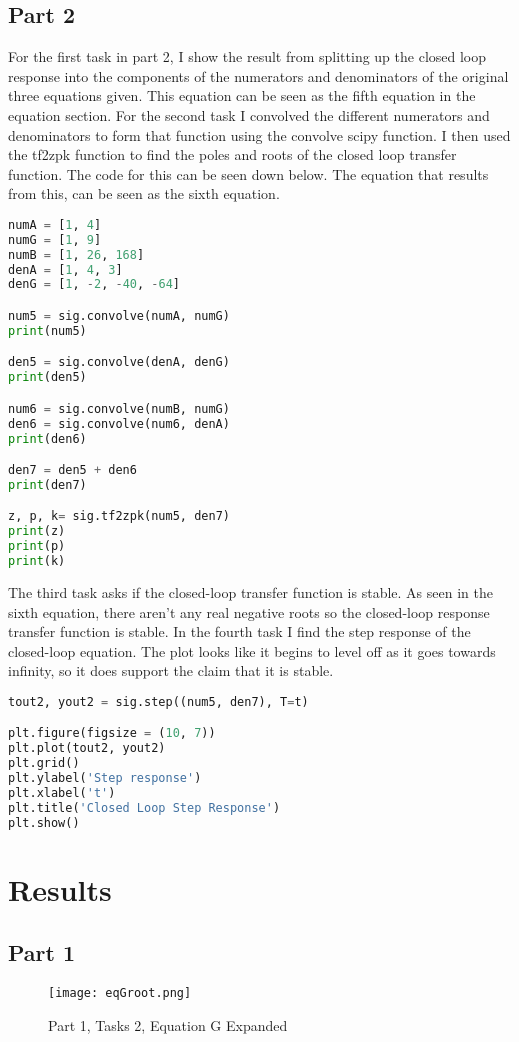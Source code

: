 \documentclass[12pt]{report}
\begin{document}
\subsection{Part 2}
For the first task in part 2, I show the result from splitting up the
closed loop response into the components of the numerators and denominators
of the original three equations given. This equation can be seen as the 
fifth equation in the equation section. For the second task I convolved the
different numerators and denominators to form that function using the
convolve scipy function. I then used the tf2zpk function to find the
poles and roots of the closed loop transfer function. The code for this can
be seen down below. The equation that results from this, can be seen as the
sixth equation.
\begin{lstlisting}[language=Python]
numA = [1, 4]
numG = [1, 9]
numB = [1, 26, 168]
denA = [1, 4, 3]
denG = [1, -2, -40, -64]

num5 = sig.convolve(numA, numG)
print(num5)

den5 = sig.convolve(denA, denG)
print(den5)

num6 = sig.convolve(numB, numG)
den6 = sig.convolve(num6, denA)
print(den6)

den7 = den5 + den6
print(den7)

z, p, k= sig.tf2zpk(num5, den7)
print(z)
print(p)
print(k)
\end{lstlisting}
The third task asks if the closed-loop transfer function is stable.
As seen in the sixth equation, there aren't any real negative roots so
the closed-loop response transfer function is stable. In the fourth
task I find the step response of the closed-loop equation. The plot looks
like it begins to level off as it goes towards infinity, so it does support
the claim that it is stable.
\begin{lstlisting}[language=Python]
tout2, yout2 = sig.step((num5, den7), T=t)

plt.figure(figsize = (10, 7))
plt.plot(tout2, yout2)
plt.grid()
plt.ylabel('Step response')
plt.xlabel('t')
plt.title('Closed Loop Step Response')
plt.show()
\end{lstlisting}
\section{Results}
\subsection{Part 1}
\begin{figure}[H]
\begin{center}
\caption{Part 1, Tasks 2, Equation G Expanded}
\texttt{[image: eqGroot.png]}
\end{center}
\end{figure}
\end{document}
